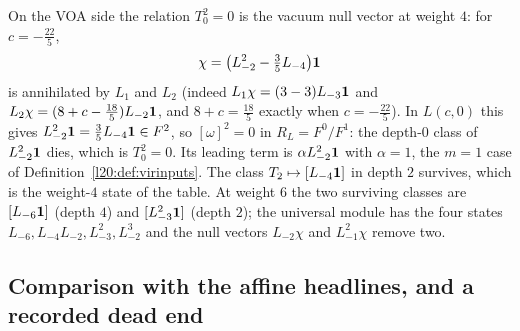 \begin{example}[{$m=1$: $\ltwentyJ(\C[T]/(T^2))$ against $L(-\frac{22}{5},0)$}]
On the VOA side the relation $T_0^2=0$ is the vacuum null vector at weight $4$: for $c=-\frac{22}{5}$,
\begin{equation*}
\chi=\bigl(L_{-2}^2-\tfrac35L_{-4}\bigr)\mathbf{1}
\end{equation*}
is annihilated by $L_1$ and $L_2$ (indeed $L_1\chi=(3-3)L_{-3}\mathbf{1}$ and $L_2\chi=(8+c-\frac{18}{5})L_{-2}\mathbf{1}$, and
$8+c=\frac{18}5$ exactly when $c=-\frac{22}5$). In $L(c,0)$ this gives $L_{-2}^2\mathbf{1}=\frac35L_{-4}\mathbf{1}\in F^2$, so
$[\omega]^2=0$ in $R_L=F^0/F^1$: the depth-$0$ class of $L_{-2}^2\mathbf{1}$ dies, which is $T_0^2=0$. Its leading term is
$\alpha L_{-2}^2\mathbf{1}$ with $\alpha=1$, the $m=1$ case of Definition~\ref{l20:def:virinputs}. The class $T_2\mapsto[L_{-4}\mathbf{1}]$
in depth $2$ survives, which is the weight-$4$ state of the table. At weight $6$ the two surviving classes are $[L_{-6}\mathbf{1}]$ (depth $4$)
and $[L_{-3}^2\mathbf{1}]$ (depth $2$); the universal module has the four states $L_{-6},L_{-4}L_{-2},L_{-3}^2,L_{-2}^3$ and the
null vectors $L_{-2}\chi$ and $L_{-1}^2\chi$ remove two.
\end{example}

\subsection{Comparison with the affine headlines, and a recorded dead end}

